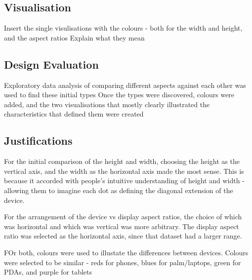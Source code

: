 \documentclass[conference]{IEEEtran}
\begin{document}
\subsection{Visualisation}

Insert the single visulisations with the colours - both for the width and height, and the aspect ratios
Explain what they mean

\subsection{Design Evaluation}

Exploratory data analysis of comparing different aspects against each other was used to find these initial types
Once the types were discovered, colours were added, and the two visualisations that mostly clearly illustrated the characteristics that defined them were created

\subsection{Justifications}

For the initial comparison of the height and width, choosing the height as the vertical axis, and the width as the horizontal axis made the most sense. This is because it accorded with people's intuitive understanding of height and width - allowing them to imagine each dot as defining the diagonal extension of the device.

For the arrangement of the device vs display aspect ratios, the choice of which was horizontal and which was vertical was more arbitrary. The display aspect ratio was selected as the horizontal axis, since that dataset had a larger range. 

FOr both, colours were used to illustate the differences between devices. Colours were selected to be similar - reds for phones, blues for palm/laptops, green for PDAs, and purple for tablets
\end{document}
